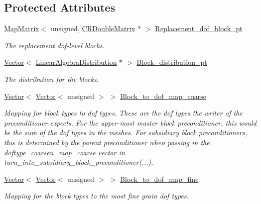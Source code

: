 \subsection*{Protected Attributes}
\begin{DoxyCompactItemize}
\item 
\hyperlink{classoomph_1_1MapMatrix}{Map\+Matrix}$<$ unsigned, \hyperlink{classoomph_1_1CRDoubleMatrix}{C\+R\+Double\+Matrix} $\ast$ $>$ \hyperlink{classoomph_1_1BlockPreconditioner_a6816cfc4c9d74a39aca7401f751bb235}{Replacement\+\_\+dof\+\_\+block\+\_\+pt}
\begin{DoxyCompactList}\small\item\em The replacement dof-\/level blocks. \end{DoxyCompactList}\item 
\hyperlink{classoomph_1_1Vector}{Vector}$<$ \hyperlink{classoomph_1_1LinearAlgebraDistribution}{Linear\+Algebra\+Distribution} $\ast$ $>$ \hyperlink{classoomph_1_1BlockPreconditioner_a59e83eca59e3cdc41a93668539e138f1}{Block\+\_\+distribution\+\_\+pt}
\begin{DoxyCompactList}\small\item\em The distribution for the blocks. \end{DoxyCompactList}\item 
\hyperlink{classoomph_1_1Vector}{Vector}$<$ \hyperlink{classoomph_1_1Vector}{Vector}$<$ unsigned $>$ $>$ \hyperlink{classoomph_1_1BlockPreconditioner_ae047d81b8179dfd09b70cf35f40f62ca}{Block\+\_\+to\+\_\+dof\+\_\+map\+\_\+coarse}
\begin{DoxyCompactList}\small\item\em Mapping for block types to dof types. These are the dof types the writer of the preconditioner expects. For the upper-\/most master block preconditioner, this would be the sum of the dof types in the meshes. For subsidiary block preconditioners, this is determined by the parent preconditioner when passing in the doftype\+\_\+coarsen\+\_\+map\+\_\+coarse vector in turn\+\_\+into\+\_\+subsidiary\+\_\+block\+\_\+preconditioner(...). \end{DoxyCompactList}\item 
\hyperlink{classoomph_1_1Vector}{Vector}$<$ \hyperlink{classoomph_1_1Vector}{Vector}$<$ unsigned $>$ $>$ \hyperlink{classoomph_1_1BlockPreconditioner_a278946969944848b12bdc2ceaed91a07}{Block\+\_\+to\+\_\+dof\+\_\+map\+\_\+fine}
\begin{DoxyCompactList}\small\item\em Mapping for the block types to the most fine grain dof types. \end{DoxyCompactList}\item 

\end{DoxyCompactItemize}
